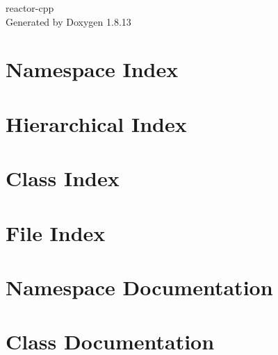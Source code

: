 \documentclass[twoside]{book}
\newcommand{\+}{\discretionary{\mbox{\scriptsize$\hookleftarrow$}}{}{}}
\newcommand{\clearemptydoublepage}{%
  \newpage{\pagestyle{empty}\cleardoublepage}%
}
\begin{document}
\hypersetup{pageanchor=false,
             bookmarksnumbered=true,
             pdfencoding=unicode
            }
\begin{titlepage}
\vspace*{7cm}
\begin{center}%
{\Large reactor-\/cpp }\\
\vspace*{1cm}
{\large Generated by Doxygen 1.8.13}\\
\end{center}
\end{titlepage}
\clearemptydoublepage
{}
\tableofcontents
\clearemptydoublepage
{}
\hypersetup{pageanchor=true}

\chapter{Namespace Index}

\chapter{Hierarchical Index}

\chapter{Class Index}

\chapter{File Index}

\chapter{Namespace Documentation}



\chapter{Class Documentation}






























\end{document}

